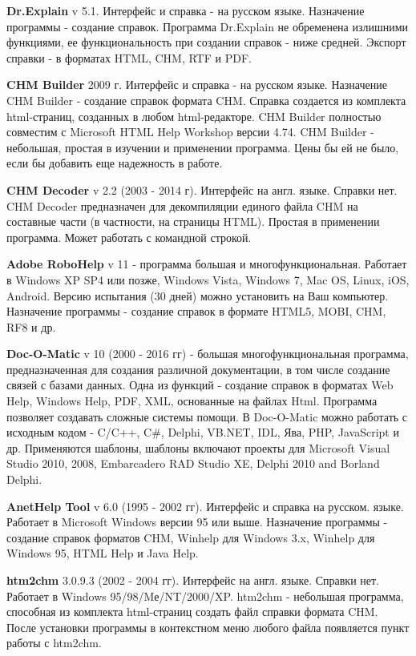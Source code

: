 		\textbf{Dr.Explain} v 5.1. Интерфейс и справка - на русском языке.
		Назначение программы - создание справок.
		Программа Dr.Explain не обременена излишними функциями, ее функциональность при создании справок - ниже средней. 
		Экспорт справки - в форматах HTML, CHM, RTF и PDF.
		
		\textbf{CHM Builder} 2009 г. Интерфейс и справка - на русском языке. 
		Назначение CHM Builder - создание справок формата CHM. Справка создается из комплекта html-страниц, созданных в любом html-редакторе.
		CHM Builder полностью совместим с Microsoft HTML Help Workshop версии 4.74. 
		CHM Builder - небольшая, простая в изучении и применении программа. Цены бы ей не было, если бы добавить еще надежность в работе.
		
		\textbf{CHM Decoder} v 2.2 (2003 - 2014 г). Интерфейс на англ. языке. Справки нет.
		CHM Decoder  предназначен для декомпиляции единого файла  CHM на составные части (в частности, на страницы HTML). Простая в применении программа.
		Может работать с командной строкой.
		
		\textbf{Adobe RoboHelp} v 11 -  программа большая и многофункциональная.
		Работает в Windows XP SP4 или позже, Windows Vista, Windows 7, Mac OS, Linux, iOS, Android. Версию испытания (30 дней) можно установить на Ваш компьютер.
		Назначение программы - создание справок в формате HTML5, MOBI, CHM, RF8 и др. 
		
		\textbf{Doc-O-Matic} v 10 (2000 - 2016 гг) - большая многофункциональная программа, предназначенная для создания различной документации, в том числе создание связей с базами данных. Одна из функций - создание справок в форматах Web Help,  Windows Help, PDF, XML, основанные на файлах Html. Программа позволяет создавать сложные системы помощи. В Doc-O-Matic можно работать с исходным кодом - C/C++, C\#, Delphi, VB.NET, IDL, Ява, PHP, JavaScript и др.
		Применяются шаблоны, шаблоны включают проекты для Microsoft Visual Studio 2010, 2008, Embarcadero RAD Studio XE, Delphi 2010 and Borland Delphi.
		
		\textbf{AnetHelp Tool} v 6.0 (1995 - 2002 гг). Интерфейс и справка на русском. языке.
		Работает в Microsoft Windows версии 95 или выше.
		Назначение программы - создание справок форматов CHM, Winhelp для Windows 3.x, Winhelp для Windows 95, HTML Help и Java Help.
		
		\textbf{htm2chm} 3.0.9.3 (2002 - 2004 гг). Интерфейс на англ. языке. Справки нет. Работает в Windows 95/98/Mе/NT/2000/XP.
		htm2chm - небольшая программа, способная из комплекта html-страниц создать файл справки формата CHM. После установки программы в контекстном меню любого файла появляется пункт работы с htm2chm.
		
